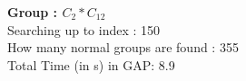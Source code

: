 \textbf{Group : $C_2*C_{12}$}\\
Searching up to index : 150\\
How many normal groups are found : 355\\
Total Time (in s) in GAP: 8.9\\
